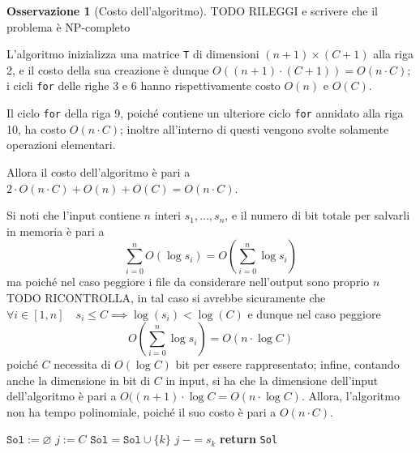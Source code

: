 \documentclass[14pt]{extreport}
\theoremstyle{definition}
\theoremstyle{definition}
\newtheorem{remark}{Osservazione}[subsection]
\begin{document}
\begin{remark}[Costo dell'algoritmo]
    TODO RILEGGI e scrivere che il problema è NP-completo

    L'algoritmo inizializza una matrice \texttt{T} di dimensioni $(n + 1) \times (C + 1)$ alla riga 2, e il costo della sua creazione è dunque $O((n + 1) \cdot (C + 1)) = O(n \cdot C)$; i cicli \texttt{for} delle righe 3 e 6 hanno rispettivamente costo $O(n)$ e $O(C)$.

    Il ciclo \texttt{for} della riga 9, poiché contiene un ulteriore ciclo \texttt{for} annidato alla riga 10, ha costo $O(n \cdot C)$; inoltre all'interno di questi vengono svolte solamente operazioni elementari.

    Allora il costo dell'algoritmo è pari a $2 \cdot O(n \cdot C) + O(n) + O(C) = O(n \cdot C)$.

    Si noti che l'input contiene $n$ interi $s_1, \ldots, s_n$, e il numero di bit totale per salvarli in memoria è pari a $$\displaystyle \sum_{i = 0}^n{O(\log s_i)} = O \left ( \sum_{i = 0}^n{\log s_i} \right )$$ ma poiché nel caso peggiore i file da considerare nell'output sono proprio $n$ TODO RICONTROLLA, in tal caso si avrebbe sicuramente che $\forall i \in [1, n] \quad s_i \le C \implies \log(s_i) < \log(C)$ e dunque nel caso peggiore $$O \left ( \sum_{i = 0}^n{\log s_i} \right ) = O(n \cdot \log C)$$ poiché $C$ necessita di $O(\log C)$ bit per essere rappresentato; infine, contando anche la dimensione in bit di $C$ in input, si ha che la dimensione dell'input dell'algoritmo è pari a $O((n + 1) \cdot \log C = O(n \cdot \log C)$. Allora, l'algoritmo non ha tempo polinomiale, poiché il suo costo è pari a $O(n \cdot C)$.
\end{remark}

\begin{algorithm}[H]
    \caption{
        Data una lista \texttt{S} di dimensioni di $n$ file, una memoria di capacità $C$, e la matrice costruita attraverso la funzione \texttt{fileAllocation} dell'\cref{fileallocation}, l'algoritmo restituisce un insieme di file che massimizza la memoria allocata; inoltre, i file hanno tutti dimensione inferiore a $C$.\\
        \textbf{Input}: \texttt{S} lista di dimensioni di file; $C$ capacità della memoria, tale che $\forall s_i \in S \quad s_i \le C$; \texttt{T} matrice prodotta precedentemente.\\
        \textbf{Output}: un insieme di file che massimizza la memoria allocata.
    }

    \begin{algorithmic}[1]
            \State $\texttt{Sol} := \varnothing$
            \State $j:= C$
             
                    \State $\texttt{Sol} = \texttt{Sol} \cup \{k\}$
                    \State $j \ -= s_k$
                \EndIf
            \EndFor
            \State \textbf{return} \texttt{Sol}
        \EndFunction
    \end{algorithmic}
\end{algorithm}
\end{document}
